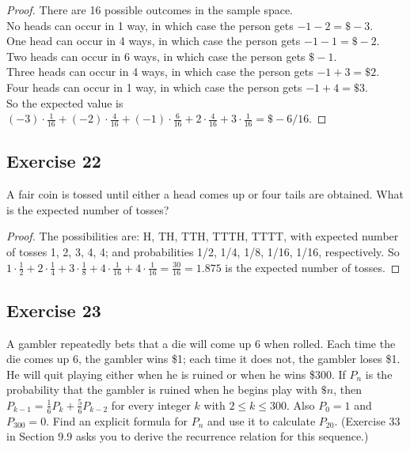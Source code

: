 \documentclass[14pt]{extarticle}
\begin{document}
\begin{proof}
There are 16 possible outcomes in the sample space. \\
No heads can occur in 1 way, in which case the person gets \(-1-2 = \$-3\). \\
One head can occur in 4 ways, in which case the person gets \(-1-1 = \$-2\). \\
Two heads can occur in 6 ways, in which case the person gets \(\$-1\). \\
Three heads can occur in 4 ways, in which case the person gets \(-1+3 = \$2\). \\
Four heads can occur in 1 way, in which case the person gets \(-1+4= \$3\). \\
So the expected value is \((-3) \cdot \frac{1}{16} + (-2) \cdot \frac{4}{16} + (-1) \cdot \frac{6}{16} + 2 \cdot 
\frac{4}{16} + 3 \cdot \frac{1}{16} = \$-6/16.\)
\end{proof}

\subsection{Exercise 22}
A fair coin is tossed until either a head comes up or four tails are obtained. What is the expected number of tosses?

\begin{proof}
The possibilities are: H, TH, TTH, TTTH, TTTT, with expected number of tosses 1, 2, 3, 4, 4; and probabilities 1/2, 1/4, 
1/8, 1/16, 1/16, respectively. So \(1 \cdot \frac{1}{2} + 2 \cdot \frac{1}{4} + 3 \cdot \frac{1}{8} + 4 \cdot \frac{1}{16} 
+ 4 \cdot \frac{1}{16} = \frac{30}{16} = 1.875\) is the expected number of tosses.
\end{proof}

\subsection{Exercise 23}
A gambler repeatedly bets that a die will come up 6 when rolled. Each time the die comes up 6, the gambler wins \$1; 
each time it does not, the gambler loses \$1. He will quit playing either when he is ruined or when he wins \$300. If 
\(P_n\) is the probability that the gambler is ruined when he begins play with \(\$n\), then \(P_{k-1} = \frac{1}{6}P_k + 
\frac{5}{6} P_{k-2}\) for every integer \(k\) with \(2 \leq k \leq 300\). Also \(P_0 = 1\) and \(P_{300} = 0\). Find an 
explicit formula for \(P_n\) and use it to calculate \(P_{20}\). (Exercise 33 in Section 9.9 asks you to derive the 
recurrence relation for this sequence.)
\end{document}
